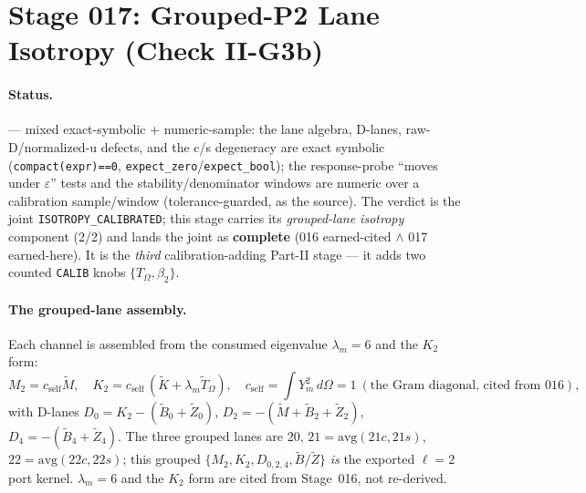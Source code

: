 \section{Stage 017: Grouped-P2 Lane Isotropy (Check II-G3b)}

\claimstatus{\StatusExactClosure}

\paragraph{Status.}
\StatusExactClosure{} --- mixed exact-symbolic + numeric-sample: the lane algebra, D-lanes,
raw-D/normalized-u defects, and the c/s degeneracy are exact symbolic
(\texttt{compact(expr)==0}, \texttt{expect\_zero}/\texttt{expect\_bool}); the response-probe
``moves under \(\varepsilon\)'' tests and the stability/denominator windows are numeric over a
calibration sample/window (tolerance-guarded, as the source). The verdict is the joint
\texttt{ISOTROPY\_CALIBRATED}; this stage carries its \emph{grouped-lane isotropy} component
(2/2) and lands the joint as \textbf{complete} (016 earned-cited \(\wedge\) 017 earned-here).
It is the \emph{third} calibration-adding Part-II stage --- it adds two counted \texttt{CALIB}
knobs \(\{T_\Omega,\beta_2\}\).

\paragraph{The grouped-lane assembly.}
Each channel is assembled from the consumed eigenvalue \(\lambda_m=6\) and the \(K_2\) form:
\[
  M_2=c_{\mathrm{self}}\tilde M,\quad
  K_2=c_{\mathrm{self}}\,(\tilde K+\lambda_m\tilde T_\Omega),\quad
  c_{\mathrm{self}}=\!\int Y_m^2\,d\Omega=1\ (\text{the Gram diagonal, cited from 016}),
\]
with D-lanes \(D_0=K_2-(\tilde B_0+\tilde Z_0)\), \(D_2=-(\tilde M+\tilde B_2+\tilde Z_2)\),
\(D_4=-(\tilde B_4+\tilde Z_4)\). The three grouped lanes are \(20\), \(21=\mathrm{avg}(21c,21s)\),
\(22=\mathrm{avg}(22c,22s)\); this grouped \(\{M_2,K_2,D_{0,2,4},\tilde B/\tilde Z\}\) \emph{is}
the exported \(\ell=2\) port kernel. \(\lambda_m=6\) and the \(K_2\) form are cited from
Stage~016, not re-derived.

